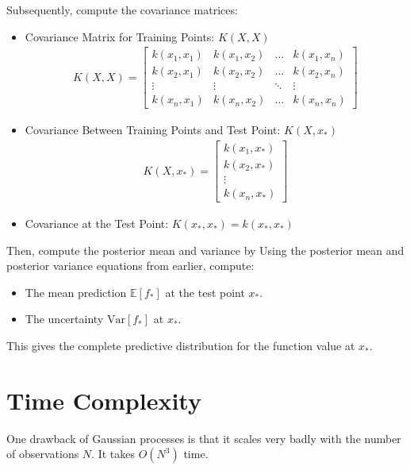 Subsequently, compute the covariance matrices:
\begin{itemize}
	\item Covariance Matrix for Training Points: $K(X, X)$
		\begin{align*}
			K(X, X) = \begin{bmatrix}
				k(x_1, x_1) & k(x_1, x_2) & \dots & k(x_1, x_n) \\
				k(x_2, x_1) & k(x_2, x_2) & \dots & k(x_2, x_n) \\
				\vdots & \vdots & \ddots & \vdots \\
				k(x_n, x_1) & k(x_n, x_2) & \dots & k(x_n, x_n)
			\end{bmatrix}
		\end{align*}
	\item Covariance Between Training Points and Test Point: $K(X, x_*)$
		\begin{align*}
			K(X, x_*) = \begin{bmatrix}
				k(x_1, x_*) \\
				k(x_2, x_*) \\
				\vdots \\
				k(x_n, x_*)
			\end{bmatrix}
		\end{align*}
	\item Covariance at the Test Point: $K(x_*, x_*) = k(x_*, x_*)$
\end{itemize}
Then, compute the posterior mean and variance by Using the posterior mean and posterior variance equations from earlier, compute:
\begin{itemize}
	\item The mean prediction $\mathbb{E}[f_*]$ at the test point $x_*$.
	\item The uncertainty $\text{Var}[f_*]$ at $x_*$.
\end{itemize}
This gives the complete predictive distribution for the function value at $x_*$.

\section{Time Complexity}

One drawback of Gaussian processes is that it scales very badly with the number of observations $N$. It takes $O(N^3)$ time.
